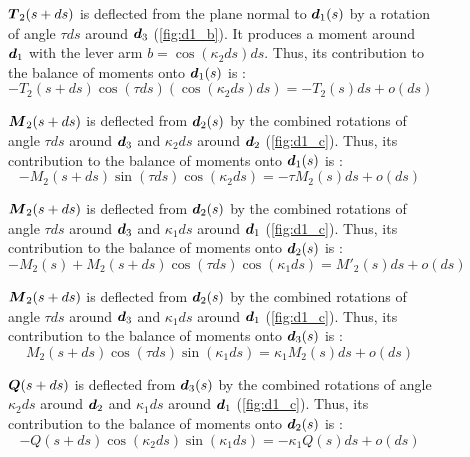 \begin{figure}[p]
\begin{fullpage}
	$\boldsymbol{T}_2(s+ds)$ is deflected from the plane normal to $\boldsymbol{d}_1(s)$ by a rotation of angle $\tau ds$ around $\boldsymbol{d}_3$ (\cref{fig:d1_b}). It produces a moment around $\boldsymbol{d}_1$ with the lever arm $b =  \cos(\kappa_2 ds) ds$. Thus, its contribution to the balance of moments onto $\boldsymbol{d}_1(s)$ is : 
	\begin{equation*}
		-T_2(s+ds) \cos(\tau ds) (\cos(\kappa_2 ds) ds) = -T_2(s) ds + o(ds)
	\end{equation*}
	
	$\boldsymbol{M}_2(s+ds)$ is deflected from $\boldsymbol{d}_2(s)$ by the combined rotations of angle $\tau ds$ around $\boldsymbol{d}_3$ and $\kappa_2 ds$ around $\boldsymbol{d}_2$ (\cref{fig:d1_c}). Thus, its contribution to the balance of moments onto $\boldsymbol{d}_1(s)$ is : 
	\begin{equation*}
		-M_2(s+ds) \sin(\tau ds) \cos(\kappa_2 ds) = -\tau M_2 (s) ds + o(ds)
	\end{equation*}	
	
	$\boldsymbol{M}_2(s+ds)$ is deflected from $\boldsymbol{d}_2(s)$ by the combined rotations of angle $\tau ds$ around $\boldsymbol{d}_3$ and $\kappa_1 ds$ around $\boldsymbol{d}_1$ (\cref{fig:d1_c}). Thus, its contribution to the balance of moments onto $\boldsymbol{d}_2(s)$ is : 
	\begin{equation*}
		-M_2(s) + M_2(s+ds) \cos(\tau ds) \cos(\kappa_1 ds) = M'_2 (s) ds + o(ds)
	\end{equation*}
	
	$\boldsymbol{M}_2(s+ds)$ is deflected from $\boldsymbol{d}_2(s)$ by the combined rotations of angle $\tau ds$ around $\boldsymbol{d}_3$ and $\kappa_1 ds$ around $\boldsymbol{d}_1$ (\cref{fig:d1_c}). Thus, its contribution to the balance of moments onto $\boldsymbol{d}_3(s)$ is : 
	\begin{equation*}
		M_2(s+ds) \cos(\tau ds) \sin(\kappa_1 ds) = \kappa_1 M_2 (s) ds + o(ds)
	\end{equation*}	
	
	$\boldsymbol{Q}(s+ds)$ is deflected from $\boldsymbol{d}_3(s)$ by the combined rotations of angle $\kappa_2 ds$ around $\boldsymbol{d}_2$ and $\kappa_1 ds$ around $\boldsymbol{d}_1$ (\cref{fig:d1_c}). Thus, its contribution to the balance of moments onto $\boldsymbol{d}_2(s)$ is : 
	\begin{equation*}
		-Q(s+ds) \cos(\kappa_2 ds) \sin(\kappa_1 ds) = -\kappa_1 Q(s) ds + o(ds)
	\end{equation*}	
	  \end{fullpage}
\end{figure}

 
